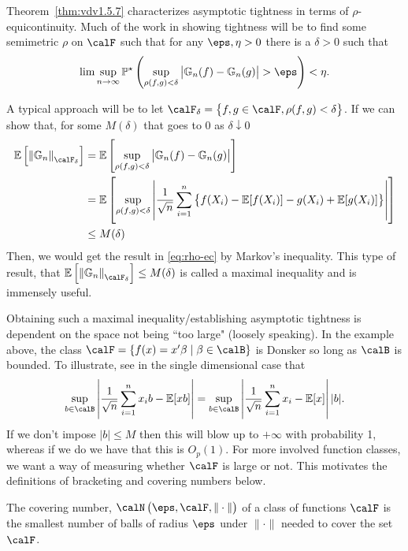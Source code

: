 Theorem~\ref{thm:vdv1.5.7} characterizes asymptotic tightness in terms of \(\rho\)-equicontinuity. Much of the work in showing tightness will be to find some semimetric \(\rho\) on \(\calF\) such that for any \(\eps, \eta > 0\) there is a  \(\delta > 0\) such that 
\begin{equation}
	\label{eq:rho-ec}
	\lim\sup_{n\to\infty}\P^\star\left(\sup_{\rho(f,g)<\delta}\left|\mathbb{G}_n(f)-\mathbb{G}_n(g)\right| > \eps\right) <\eta.
\end{equation}

A typical approach will be to let \(\calF_{{}\delta} = \left\{f,g \in \calF, \rho(f,g)<\delta\right\}\). If we can show that, for some \(M(\delta)\) that goes to 0 as \(\delta\downarrow 0\)
\begin{align*}
	\E\left[\left\|\mathbb{G}_n\right\|_{\calF_{{}\delta}}\right] 
	&= \E\left[\sup_{\rho(f,g)<\delta}\left|\mathbb{G}_n(f)-\mathbb{G}_n(g)\right|\right] \\
	&= \E\left[\sup_{\rho(f,g)<\delta}\left|\frac{1}{\sqrt{n}} \sum_{i=1}^n\left\{ f(X_i) - \E[f(X_i)] - g(X_i) + \E[g(X_i)]\right\}\right|\right] \\
	&\leq M(\delta)
\end{align*}
Then, we would get the result in \eqref{eq:rho-ec} by Markov's inequality. This type of result, that \(\E\left[\left\|\mathbb{G}_n\right\|_{\calF_{{}\delta}}\right] \leq M(\delta)\) is called a maximal inequality and is immensely useful.

Obtaining such a maximal inequality/establishing asymptotic tightness is dependent on the space not being ``too large" (loosely speaking). In the example above, the class \(\calF = \{f(x) = x'\beta\mid \beta\in\calB\} \) is Donsker so long as \(\calB\) is bounded. To illustrate, see in the single dimensional case that
\[
	\sup_{b\in \calB}\left|\frac{1}{\sqrt{n}}\sum_{i=1}^n x_ib - \E[xb] \right| = \sup_{b\in\calB} \left|\frac{1}{\sqrt{n}}\sum_{i=1}^n x_i - \E[x] \right||b|
.\]
If we don't impose \(|b|\leq M\) then this will blow up to \(+\infty\) with probability 1, whereas if we do we have that this is  \(O_p(1)\). For more involved function classes, we want a way of measuring whether  \(\calF\) is large or not. This motivates the definitions of bracketing and covering numbers below.

\begin{definition}
	\label{def:covering}
	The covering number, \(\calN\left(\eps,\calF,\|\cdot\|\right)\) of a class of functions \(\calF\) is the smallest number of balls of radius  \(\eps\) under  \(\|\cdot\|\) needed to cover the set \(\calF\).
\end{definition}


